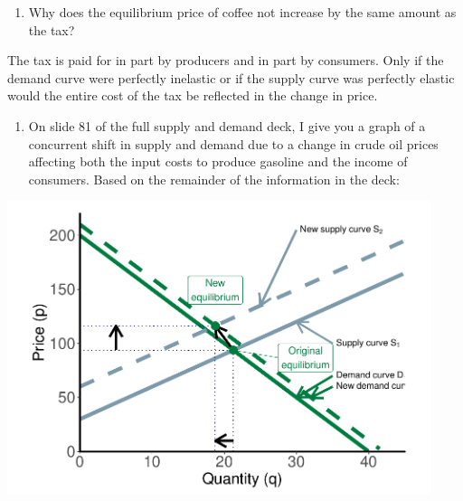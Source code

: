\documentclass[11pt,]{article}
\providecommand{\tightlist}{%
  \setlength{\itemsep}{0pt}\setlength{\parskip}{0pt}}
\begin{document}
\begin{enumerate}
\def\labelenumi{\alph{enumi})}
\setcounter{enumi}{2}
\tightlist
\item
  Why does the equilibrium price of coffee not increase by the same
  amount as the tax?
\end{enumerate}

The tax is paid for in part by producers and in part by consumers. Only
if the demand curve were perfectly inelastic or if the supply curve was
perfectly elastic would the entire cost of the tax be reflected in the
change in price.

\newpage

\begin{enumerate}
\def\labelenumi{\arabic{enumi}.}
\setcounter{enumi}{2}
\tightlist
\item
  On slide 81 of the full supply and demand deck, I give you a graph of
  a concurrent shift in supply and demand due to a change in crude oil
  prices affecting both the input costs to produce gasoline and the
  income of consumers. Based on the remainder of the information in the
  deck:
\end{enumerate}

\begin{center}\includegraphics[width=468px]{week_3_problems_soln_files/figure-latex/q_3_graphs-1} \end{center}
\end{document}
